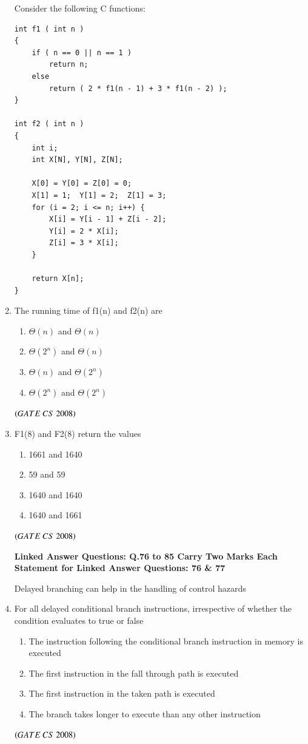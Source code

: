 \documentclass[journal, onecolumn]{IEEEtran}
\numberwithin{equation}{enumi}
\numberwithin{figure}{enumi}
\begin{document}
\begin{enumerate}
Consider the following C functions:  

\begin{verbatim}
int f1 ( int n )
{
    if ( n == 0 || n == 1 )
        return n;
    else
        return ( 2 * f1(n - 1) + 3 * f1(n - 2) );
}

int f2 ( int n )
{
    int i;
    int X[N], Y[N], Z[N];

    X[0] = Y[0] = Z[0] = 0;
    X[1] = 1;  Y[1] = 2;  Z[1] = 3;
    for (i = 2; i <= n; i++) {
        X[i] = Y[i - 1] + Z[i - 2];
        Y[i] = 2 * X[i];
        Z[i] = 3 * X[i];
    }

    return X[n];
}
\end{verbatim}

\item The running time of f1(n) and f2(n) are
\begin{multicols}{2}
\begin{enumerate}
   \item $\Theta(n)$ and $\Theta(n)$  
   \item $\Theta(2^n)$ and $\Theta(n)$  
   \item $\Theta(n)$ and $\Theta(2^n)$  
   \item $\Theta(2^n)$ and $\Theta(2^n)$  
\end{enumerate}
\end{multicols}
\hfill $\left(GATE\ CS\  2008\right)$

\item F1(8) and F2(8) return the values 
\begin{multicols}{2}
\begin{enumerate}
   \item 1661 and 1640  
   \item 59 and 59  
   \item 1640 and 1640  
   \item 1640 and 1661  
\end{enumerate}
\end{multicols}
\hfill $\left(GATE\ CS\  2008\right)$

\begin{center}
\textbf{Linked Answer Questions: Q.76 to 85 Carry Two Marks Each}\\
\bigskip
\textbf{Statement for Linked Answer Questions: 76 \& 77}
\end{center}
Delayed branching can help in the handling of control hazards  

\item For all delayed conditional branch instructions, irrespective of whether the condition evaluates to true or false  
\begin{enumerate}
   \item The instruction following the conditional branch instruction in memory is executed  
   \item The first instruction in the fall through path is executed  
   \item The first instruction in the taken path is executed  
   \item The branch takes longer to execute than any other instruction  
\end{enumerate}
\bigskip
\hfill $\left(GATE\ CS\  2008\right)$


\end{enumerate}
\end{document}
